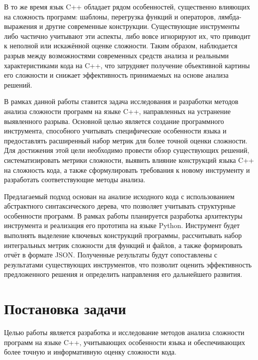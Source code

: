 \documentclass[a4paper,12pt]{article}
\begin{document}
В то же время язык C++ обладает рядом особенностей, существенно влияющих на сложность программ: шаблоны, перегрузка функций и операторов, лямбда-выражения и другие современные конструкции. Существующие инструменты либо частично учитывают эти аспекты, либо вовсе игнорируют их, что приводит к неполной или искажённой оценке сложности. Таким образом, наблюдается разрыв между возможностями современных средств анализа и реальными характеристиками кода на C++, что затрудняет получение объективной картины его сложности и снижает эффективность принимаемых на основе анализа решений.

В рамках данной работы ставится задача исследования и разработки методов анализа сложности программ на языке C++, направленных на устранение выявленного разрыва. Основной целью является создание программного инструмента, способного учитывать специфические особенности языка и предоставлять расширенный набор метрик для более точной оценки сложности. Для достижения этой цели необходимо провести обзор существующих решений, систематизировать метрики сложности, выявить влияние конструкций языка C++ на сложность кода, а также сформулировать требования к новому инструменту и разработать соответствующие методы анализа.

Предлагаемый подход основан на анализе исходного кода с использованием абстрактного синтаксического дерева, что позволяет учитывать структурные особенности программ. В рамках работы планируется разработка архитектуры инструмента и реализация его прототипа на языке Python. Инструмент будет выполнять выделение ключевых конструкций программы, рассчитывать набор интегральных метрик сложности для функций и файлов, а также формировать отчёт в формате JSON. Полученные результаты будут сопоставлены с результатами существующих инструментов, что позволит оценить эффективность предложенного решения и определить направления его дальнейшего развития.


\newpage


\section{Постановка задачи}
Целью работы является разработка и исследование методов анализа сложности программ на языке C++, учитывающих особенности языка и обеспечивающих более точную и информативную оценку сложности кода.
\end{document}
